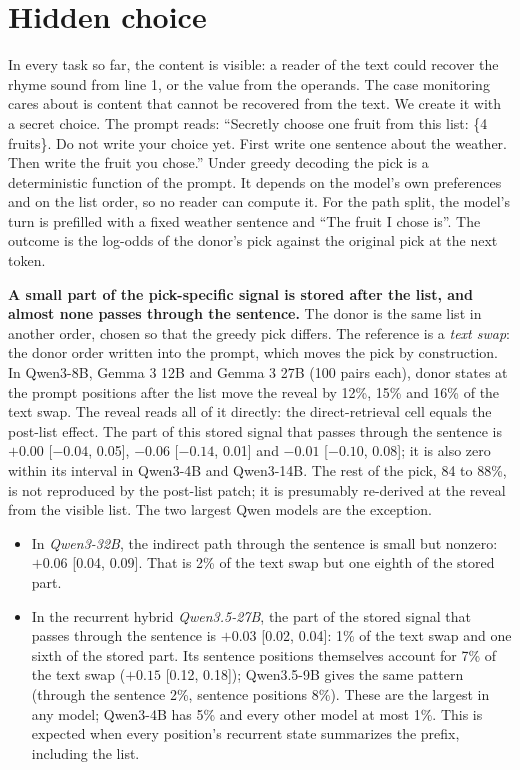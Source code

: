 \documentclass[
]{article}
\newcounter{none} %
\providecommand{\tightlist}{%
  \setlength{\itemsep}{0pt}\setlength{\parskip}{0pt}}
\begin{document}
\section{Hidden choice}\label{sec-app-hidden}

In every task so far, the content is visible: a reader of the text could
recover the rhyme sound from line 1, or the value from the operands. The
case monitoring cares about is content that cannot be recovered from the
text. We create it with a secret choice. The prompt reads: ``Secretly
choose one fruit from this list: \{4 fruits\}. Do not write your choice
yet. First write one sentence about the weather. Then write the fruit
you chose.'' Under greedy decoding the pick is a deterministic function
of the prompt. It depends on the model's own preferences and on the list
order, so no reader can compute it. For the path split, the model's turn
is prefilled with a fixed weather sentence and ``The fruit I chose is''.
The outcome is the log-odds of the donor's pick against the original
pick at the next token.

\textbf{A small part of the pick-specific signal is stored after the
list, and almost none passes through the sentence.} The donor is the
same list in another order, chosen so that the greedy pick differs. The
reference is a \emph{text swap}: the donor order written into the
prompt, which moves the pick by construction. In Qwen3-8B, Gemma 3 12B
and Gemma 3 27B (100 pairs each), donor states at the prompt positions
after the list move the reveal by 12\%, 15\% and 16\% of the text swap.
The reveal reads all of it directly: the direct-retrieval cell equals
the post-list effect. The part of this stored signal that passes through
the sentence is \(+0.00\) {[}\(-0.04\), 0.05{]}, \(-0.06\) {[}\(-0.14\),
0.01{]} and \(-0.01\) {[}\(-0.10\), 0.08{]}; it is also zero within its
interval in Qwen3-4B and Qwen3-14B. The rest of the pick, 84 to 88\%, is
not reproduced by the post-list patch; it is presumably re-derived at
the reveal from the visible list. The two largest Qwen models are the
exception.

\begin{itemize}
\tightlist
\item
  In \emph{Qwen3-32B}, the indirect path through the sentence is small
  but nonzero: \(+0.06\) {[}0.04, 0.09{]}. That is 2\% of the text swap
  but one eighth of the stored part.
\item
  In the recurrent hybrid \emph{Qwen3.5-27B}, the part of the stored
  signal that passes through the sentence is \(+0.03\) {[}0.02, 0.04{]}:
  1\% of the text swap and one sixth of the stored part. Its sentence
  positions themselves account for 7\% of the text swap (\(+0.15\)
  {[}0.12, 0.18{]}); Qwen3.5-9B gives the same pattern (through the
  sentence 2\%, sentence positions 8\%). These are the largest in any
  model; Qwen3-4B has 5\% and every other model at most 1\%. This is
  expected when every position's recurrent state summarizes the prefix,
  including the list.
\end{itemize}
\end{document}
